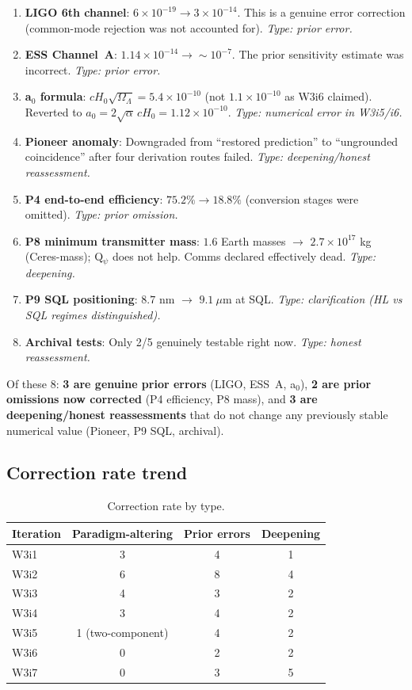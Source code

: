 \documentclass[11pt]{article}
\newcommand{\ee}[1]{\times 10^{#1}}
\begin{document}
\begin{enumerate}[nosep]
\item \textbf{LIGO 6th channel}: $6\ee{-19} \to 3\ee{-14}$. This is a
  genuine error correction (common-mode rejection was not accounted for).
  \emph{Type: prior error.}
\item \textbf{ESS Channel~A}: $1.14\ee{-14} \to \sim 10^{-7}$. The prior
  sensitivity estimate was incorrect. \emph{Type: prior error.}
\item \textbf{a$_0$ formula}: $c H_0 \sqrt{\Omega_\Lambda} = 5.4\ee{-10}$
  (not $1.1\ee{-10}$ as W3i6 claimed). Reverted to
  $a_0 = 2\sqrt{\alpha}\,cH_0 = 1.12\ee{-10}$. \emph{Type: numerical error
  in W3i5/i6.}
\item \textbf{Pioneer anomaly}: Downgraded from ``restored prediction'' to
  ``ungrounded coincidence'' after four derivation routes failed.
  \emph{Type: deepening/honest reassessment.}
\item \textbf{P4 end-to-end efficiency}: $75.2\% \to 18.8\%$ (conversion
  stages were omitted). \emph{Type: prior omission.}
\item \textbf{P8 minimum transmitter mass}: $1.6$ Earth masses $\to$
  $2.7\ee{17}$ kg (Ceres-mass); Q$_\psi$ does not help. Comms declared
  effectively dead. \emph{Type: deepening.}
\item \textbf{P9 SQL positioning}: $8.7$ nm $\to$ $9.1~\mu$m at SQL.
  \emph{Type: clarification (HL vs SQL regimes distinguished).}
\item \textbf{Archival tests}: Only 2/5 genuinely testable right now.
  \emph{Type: honest reassessment.}
\end{enumerate}

Of these 8: \textbf{3 are genuine prior errors} (LIGO, ESS~A, a$_0$),
\textbf{2 are prior omissions now corrected} (P4 efficiency, P8 mass),
and \textbf{3 are deepening/honest reassessments} that do not change any
previously stable numerical value (Pioneer, P9 SQL, archival).

\subsection{Correction rate trend}

\begin{table}[H]
\centering
\caption{Correction rate by type.}
\label{tab:correction-type}
\begin{tabular}{lccc}
\toprule
\textbf{Iteration} & \textbf{Paradigm-altering} & \textbf{Prior errors} & \textbf{Deepening} \\
\midrule
W3i1 & 3 & 4 & 1 \\
W3i2 & 6 & 8 & 4 \\
W3i3 & 4 & 3 & 2 \\
W3i4 & 3 & 4 & 2 \\
W3i5 & 1 (two-component) & 4 & 2 \\
W3i6 & 0 & 2 & 2 \\
W3i7 & 0 & 3 & 5 \\
\bottomrule
\end{tabular}
\end{table}
\end{document}
